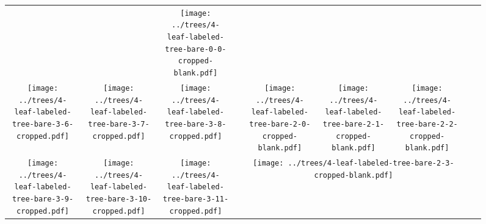 \documentclass[border=10pt,varwidth=30cm]{standalone}
\newcommand{\pltwidth}{0.1}
\begin{document}
\begin{figure}
\begin{tabular}{@{}ccccccccc@{}}
        &
        &
        \texttt{[image: ../trees/4-leaf-labeled-tree-bare-0-0-cropped-blank.pdf]}
        \\
        \texttt{[image: ../trees/4-leaf-labeled-tree-bare-3-6-cropped.pdf]}
        &
        \texttt{[image: ../trees/4-leaf-labeled-tree-bare-3-7-cropped.pdf]}
        &
        \texttt{[image: ../trees/4-leaf-labeled-tree-bare-3-8-cropped.pdf]}
        &
        &
        \texttt{[image: ../trees/4-leaf-labeled-tree-bare-2-0-cropped-blank.pdf]}
        &
        \texttt{[image: ../trees/4-leaf-labeled-tree-bare-2-1-cropped-blank.pdf]}
        &
        \texttt{[image: ../trees/4-leaf-labeled-tree-bare-2-2-cropped-blank.pdf]}
        &
        &
        \\
        \texttt{[image: ../trees/4-leaf-labeled-tree-bare-3-9-cropped.pdf]}
        &
        \texttt{[image: ../trees/4-leaf-labeled-tree-bare-3-10-cropped.pdf]}
        &
        \texttt{[image: ../trees/4-leaf-labeled-tree-bare-3-11-cropped.pdf]}
        &
        &
        \multicolumn{3}{c}{\texttt{[image: ../trees/4-leaf-labeled-tree-bare-2-3-cropped-blank.pdf]}}
        &
        &
        \\
    \end{tabular}
\end{figure}
\end{document}
